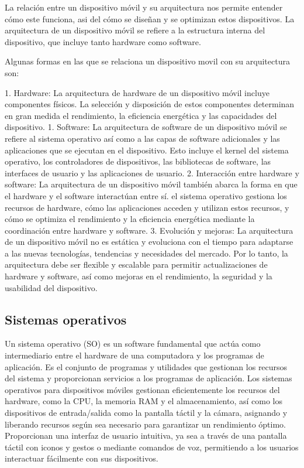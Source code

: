 \documentclass{article}
\begin{document}
\begin{multicols}{2}
		La relación entre un dispositivo móvil y su arquitectura nos permite entender cómo este funciona, asi del cómo se diseñan y se optimizan estos dispositivos. La arquitectura de un dispositivo móvil se refiere a la estructura interna del dispositivo, que incluye tanto hardware como software.
		
		Algunas formas en las que se relaciona un dispositivo movil con su arquitectura son:
		
		1. Hardware: La arquitectura de hardware de un dispositivo móvil incluye componentes físicos. La selección y disposición de estos componentes determinan en gran medida el rendimiento, la eficiencia energética y las capacidades del dispositivo.
		1. Software: La arquitectura de software de un dispositivo móvil se refiere al sistema operativo  así como a las capas de software adicionales y las aplicaciones que se ejecutan en el dispositivo. Esto incluye el kernel del sistema operativo, los controladores de dispositivos, las bibliotecas de software, las interfaces de usuario y las aplicaciones de usuario. 
		2. Interacción entre hardware y software: La arquitectura de un dispositivo móvil también abarca la forma en que el hardware y el software interactúan entre sí. el sistema operativo gestiona los recursos de hardware, cómo las aplicaciones acceden y utilizan estos recursos, y cómo se optimiza el rendimiento y la eficiencia energética mediante la coordinación entre hardware y software.
		3. Evolución y mejoras: La arquitectura de un dispositivo móvil no es estática y evoluciona con el tiempo para adaptarse a las nuevas tecnologías, tendencias y necesidades del mercado. Por lo tanto, la arquitectura debe ser flexible y escalable para permitir actualizaciones de hardware y software, así como mejoras en el rendimiento, la seguridad y la usabilidad del dispositivo.
		
		
		\subsection{Sistemas operativos}
Un sistema operativo (SO) es un software fundamental que actúa como intermediario entre el hardware de una computadora y los programas de aplicación. Es el conjunto de programas y utilidades que gestionan los recursos del sistema y proporcionan servicios a los programas de aplicación. 
Los sistemas operativos para dispositivos móviles gestionan eficientemente los recursos del hardware, como la CPU, la memoria RAM y el almacenamiento, así como los dispositivos de entrada/salida como la pantalla táctil y la cámara, asignando y liberando recursos según sea necesario para garantizar un rendimiento óptimo. Proporcionan una interfaz de usuario intuitiva, ya sea a través de una pantalla táctil con iconos y gestos o mediante comandos de voz, permitiendo a los usuarios interactuar fácilmente con sus dispositivos. 
		

\end{multicols}
\end{document}
